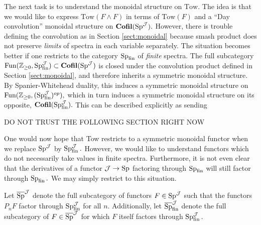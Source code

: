 The next task is to understand the monoidal structure on $\text{Tow}$.  The idea is that we would like to express $\text{Tow}(F\wedge F)$ in terms of $\text{Tow}(F)$ and a ``Day convolution'' monoidal structure on $\Cofil(\Sp^{\J}).$  However, there is trouble defining the convolution as in Section \ref{sect:monoidal} because smash product does not preserve \emph{limits} of spectra in each variable separately.  The situation becomes better if one restricts to the category $\Sp_{\fin}$ of \emph{finite} spectra.  The full subcategory $\Fun(\Z_{\geq 0}, \Sp_{\fin}^{\J})\subset \Cofil(\Sp^{\J})$ is closed under the convolution product defined in Section \ref{sect:monoidal}, and therefore inherits a symmetric monoidal structure.  By Spanier-Whitehead duality, this induces a symmetric monoidal structure on $\Fun(\Z_{\geq 0},(\Sp_{\fin}^{\J})^{op}),$ which in turn induces a symmetric monoidal structure on its opposite, $\Cofil(\Sp^{\J}_{\fin}).$  This can be described explicitly as sending %

DO NOT TRUST THE FOLLOWING SECTION RIGHT NOW


One would now hope that Tow restricts to a symmetric monoidal functor when we replace $\Sp^{\J}$ by $\Sp^{\J}_{\fin}.$  However, we would like to understand functors which do not necessarily take values in finite spectra.  Furthermore, it is not even clear that the derivatives of a functor $\J \to \Sp$ factoring through $\Sp_{\fin}$ will still factor through $\Sp_{\fin}.$  We may simply restrict to this situation.  

\begin{dfn} \label{dfn:stronglyfinite}

Let $\overline{\Sp}^{\J}$ denote the full subcategory of functors $F\in \Sp^{\J}$ such that the functors $P_nF$ factor through $\Sp_{\fin}^{\J}$ for all $n$.  Additionally, let $\overline{\Sp}^{\J}_{\fin}$ denote the full subcategory of $F\in \overline{\Sp}^{\J}$ for which $F$ itself factors through $\Sp^{\J}_{\fin}.$  %
\end{dfn}

